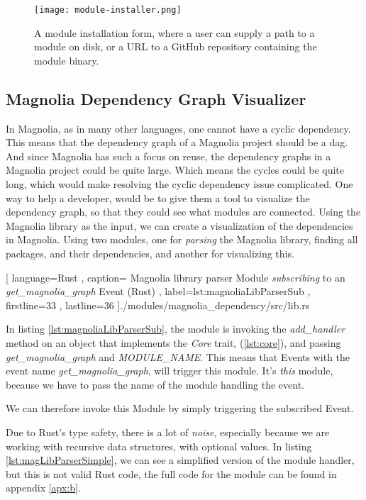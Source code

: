 \begin{figure}
  \centering
  \texttt{[image: module-installer.png]}
  \caption{
    A module installation form, where a user can supply a path to a module on
    disk, or a URL to a GitHub repository containing the module binary.
  }
  \label{pic:moduleInstaller}
\end{figure}

\subsection{Magnolia Dependency Graph Visualizer}

In Magnolia, as in many other languages, one cannot have a cyclic dependency.
This means that the dependency graph of a Magnolia project should be a
\gls{dag}. And since Magnolia has such a focus on reuse, the dependency graphs
in a Magnolia project could be quite large. Which means the cycles could be
quite long, which would make resolving the cyclic dependency issue complicated.
One way to help a developer, would be to give them a tool to visualize the
dependency graph, so that they could see what modules are connected. Using the
Magnolia library as the input, we can create a visualization of the dependencies
in Magnolia. Using two modules, one for \textit{parsing} the Magnolia library,
finding all packages, and their dependencies, and another for visualizing
this.

\begin{center}
  
    [ language=Rust
    , caption={
      Magnolia library parser Module \textit{subscribing} to an
      \textit{get\_magnolia\_graph } Event (Rust)
    }
    , label=lst:magnoliaLibParserSub
    , firstline=33
    , lastline=36
    ]{./modules/magnolia\_dependency/src/lib.rs}
\end{center}

In listing \ref{lst:magnoliaLibParserSub}, the module is invoking the
\textit{add\_handler} method on an object that implements the \textit{Core} trait,
(\ref{lst:core}), and passing \textit{get\_magnolia\_graph} and
\textit{MODULE\_NAME}. This means that Events with the event name
\textit{get\_magnolia\_graph}, will trigger this module. It's \textit{this}
module, because we have to pass the name of the module handling the event.

We can therefore invoke this Module by simply triggering the subscribed Event.

Due to Rust's type safety, there is a lot of \textit{noise}, especially because
we are working with recursive data structures, with optional values. In listing
\ref{lst:magLibParserSimple}, we can see a simplified version of the module
handler, but this is not valid Rust code, the full code for the module can be
found in appendix \ref{apx:b}.


